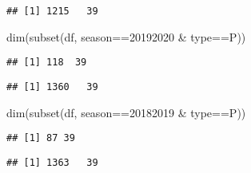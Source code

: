\documentclass[
]{article}
\newenvironment{Shaded}{\begin{snugshade}}{\end{snugshade}}
\newcommand{\DecValTok}[1]{\textcolor[rgb]{0.00,0.00,0.81}{#1}}
\newcommand{\FunctionTok}[1]{\textcolor[rgb]{0.00,0.00,0.00}{#1}}
\newcommand{\NormalTok}[1]{#1}
\newcommand{\SpecialCharTok}[1]{\textcolor[rgb]{0.00,0.00,0.00}{#1}}
\newcommand{\StringTok}[1]{\textcolor[rgb]{0.31,0.60,0.02}{#1}}
\begin{document}
\begin{verbatim}
## [1] 1215   39
\end{verbatim}

\begin{Shaded}
\begin{Highlighting}[]
\FunctionTok{dim}\NormalTok{(}\FunctionTok{subset}\NormalTok{(df, season}\SpecialCharTok{==}\DecValTok{20192020} \SpecialCharTok{\&}\NormalTok{ type}\SpecialCharTok{==}\StringTok{\textquotesingle{}P\textquotesingle{}}\NormalTok{))}
\end{Highlighting}
\end{Shaded}

\begin{verbatim}
## [1] 118  39
\end{verbatim}

\begin{Shaded}
\end{Shaded}

\begin{verbatim}
## [1] 1360   39
\end{verbatim}

\begin{Shaded}
\begin{Highlighting}[]
\FunctionTok{dim}\NormalTok{(}\FunctionTok{subset}\NormalTok{(df, season}\SpecialCharTok{==}\DecValTok{20182019} \SpecialCharTok{\&}\NormalTok{ type}\SpecialCharTok{==}\StringTok{\textquotesingle{}P\textquotesingle{}}\NormalTok{))}
\end{Highlighting}
\end{Shaded}

\begin{verbatim}
## [1] 87 39
\end{verbatim}

\begin{Shaded}
\end{Shaded}

\begin{verbatim}
## [1] 1363   39
\end{verbatim}
\end{document}
